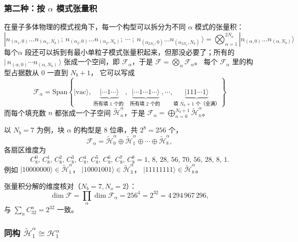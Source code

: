 \documentclass[11pt]{ctexart}
\begin{document}
\subsubsection{第二种：按 $\alpha$ 模式张量积}
在量子多体物理的模式视角下，每一个构型可以拆分为不同 $\alpha$ 模式的张量积：
\[
|n_{(\alpha_1,0)}\dots n_{(\alpha_1,N_b)}
;\ n_{(\alpha_2,0)}\dots n_{(\alpha_2,N_b)}
;\ \cdots\
;\ n_{(\alpha_{2N_o},0)}\dots n_{(\alpha_{2N_o},N_b)}\,\rangle=\bigotimes_{\alpha=1}^{2N_o}|n_{(\alpha,0)}\dots n_{(\alpha,N_b)}\rangle
\]
每个$\alpha$ 段还可以拆到有最小单粒子模式张量积起来，但那没必要了；所有的
$|\,n_{(\alpha,0)}\cdots n_{(\alpha,N_b)}\,\rangle$ 张成一个空间，即
$\mathcal{F}_\alpha$，于是 $\mathcal{F}=\bigotimes_\alpha\mathcal{F}_\alpha$。
每个 $\mathcal{F}_\alpha$ 里的构型占据数从 $0$ 一直到 $N_b+1$，
它可以写成
\begin{equation*}
    \mathcal{F}_\alpha=\mathrm{Span}\left\{|\mathrm{vac}\rangle,\ \underbrace{|\cdots1\cdots\rangle}_{\text{所有填 1 个的 }},\
    \underbrace{|\cdots1\cdots1\cdots\rangle}_{\text{所有填 2 个的 }},\cdots,
    \underbrace{|111\cdots1\rangle}_{\text{填 } N_b+1 \text{ 个（全满）}}\right\}
\end{equation*}
而每个填充数 $n$ 都张成一个子空间 $\tilde{\mathcal{H}}_n^\alpha$，于是
$\mathcal{F}_\alpha=\bigoplus_{n=0}^{N_b+1}\tilde{\mathcal{H}}_n^\alpha$。

以 $N_b=7$ 为例，块 $\alpha$ 的构型是 8 位串，共 $2^8=256$ 个，
\[
\mathcal{F}_\alpha=\tilde{\mathcal{H}}_0^\alpha\oplus\tilde{\mathcal{H}}_1^\alpha
\oplus\cdots\oplus\tilde{\mathcal{H}}_8^\alpha,
\]
各扇区维度为
\[
C_8^0,\,C_8^1,\,C_8^2,\,C_8^3,\,C_8^4,\,C_8^5,\,C_8^6,\,C_8^7,\,C_8^8
=1,\,8,\,28,\,56,\,70,\,56,\,28,\,8,\,1.
\]
例如 $|10000000\rangle\in\tilde{\mathcal{H}}_1^\alpha$，
$|10001001\rangle\in\tilde{\mathcal{H}}_3^\alpha$，
$|11111111\rangle\in\tilde{\mathcal{H}}_8^\alpha$。

张量积分解的维度核对（$N_b=7,N_o=2$）：
\[
\dim\mathcal{F}=\prod_\alpha\dim\mathcal{F}_\alpha
=256^4=2^{32}=4\,294\,967\,296,
\]
与 $\sum_n C_{32}^n=2^{32}$ 一致。

\subsubsection{同构 $\tilde{\mathcal{H}}_1^\alpha\cong\mathcal{H}_1^\alpha$}
\end{document}
